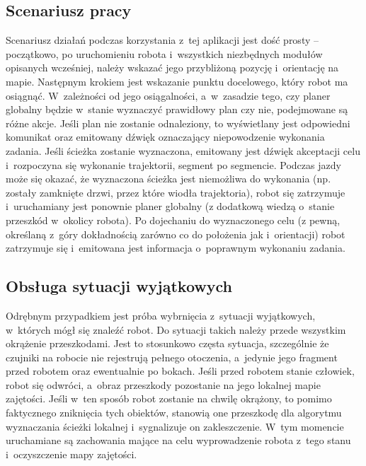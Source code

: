 \subsection{Scenariusz pracy}

Scenariusz działań podczas korzystania z~tej aplikacji jest dość prosty -- początkowo,
po uruchomieniu robota i~wszystkich niezbędnych modułów opisanych wcześniej, należy
wskazać jego przybliżoną pozycję i~orientację na mapie. Następnym krokiem jest
wskazanie punktu docelowego, który robot ma osiągnąć. W~zależności od jego osiągalności,
a~w~zasadzie tego, czy planer globalny będzie w~stanie wyznaczyć prawidłowy plan
czy nie, podejmowane są różne akcje. Jeśli plan nie zostanie odnaleziony, to wyświetlany
jest odpowiedni komunikat oraz emitowany dźwięk oznaczający niepowodzenie wykonania
zadania. Jeśli ścieżka zostanie wyznaczona, emitowany jest dźwięk akceptacji celu
i~rozpoczyna się wykonanie trajektorii, segment po segmencie. Podczas jazdy może się
okazać, że wyznaczona ścieżka jest niemożliwa do wykonania (np. zostały zamknięte
drzwi, przez które wiodła trajektoria), robot się zatrzymuje i~uruchamiany jest
ponownie planer globalny (z dodatkową wiedzą o~stanie przeszkód w~okolicy robota).
Po dojechaniu do wyznaczonego celu (z pewną, określaną z~góry dokładnością zarówno
co do położenia jak i~orientacji) robot zatrzymuje się i~emitowana jest informacja
o~poprawnym wykonaniu zadania.

\subsection{Obsługa sytuacji wyjątkowych}

Odrębnym przypadkiem jest próba wybrnięcia z~sytuacji wyjątkowych, w~których mógł się
znaleźć robot. Do sytuacji takich należy przede wszystkim okrążenie przeszkodami.
Jest to stosunkowo częsta sytuacja, szczególnie że czujniki na robocie nie rejestrują
pełnego otoczenia, a~jedynie jego fragment przed robotem oraz ewentualnie po bokach.
Jeśli przed robotem stanie człowiek, robot się odwróci, a~obraz przeszkody pozostanie
na jego lokalnej mapie zajętości. Jeśli w~ten sposób robot zostanie na chwilę okrążony,
to pomimo faktycznego zniknięcia tych obiektów, stanowią one przeszkodę dla algorytmu
wyznaczania ścieżki lokalnej i~sygnalizuje on zakleszczenie. W~tym momencie uruchamiane
są zachowania mające na celu wyprowadzenie robota z~tego stanu i~oczyszczenie mapy
zajętości.

